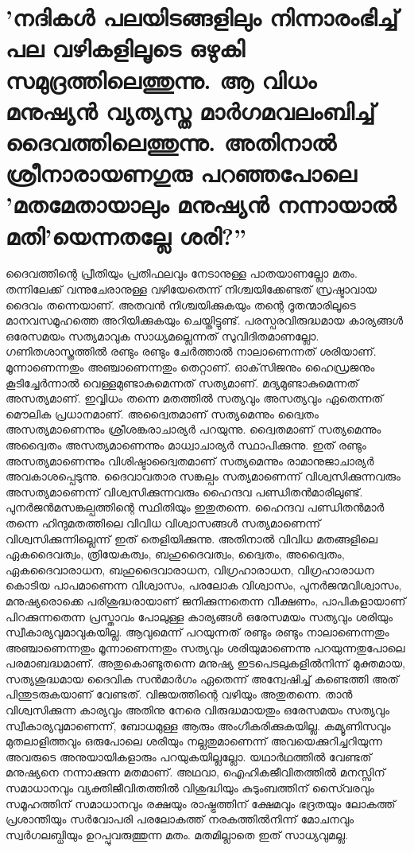  \section{'നദികള്‍ പലയിടങ്ങളിലും നിന്നാരംഭിച്ച് പല വഴികളിലൂടെ ഒഴുകി സമുദ്രത്തിലെത്തുന്നു. ആ വിധം മനുഷ്യന്‍ വ്യത്യസ്ത മാര്‍ഗമവലംബിച്ച് ദൈവത്തിലെത്തുന്നു. അതിനാല്‍ ശ്രീനാരായണഗുരു പറഞ്ഞപോലെ 'മതമേതായാലും മനുഷ്യന്‍ നന്നായാല്‍ മതി'യെന്നതല്ലേ ശരി?''}

ദൈവത്തിന്റെ പ്രീതിയും പ്രതിഫലവും നേടാനുള്ള പാതയാണല്ലോ മതം. തന്നിലേക്ക് വന്നുചേരാനുള്ള വഴിയേതെന്ന് നിശ്ചയിക്കേണ്ടത് സ്രഷ്ടാവായ ദൈവം തന്നെയാണ്. അതവന്‍ നിശ്ചയിക്കുകയും തന്റെ ദൂതന്മാരിലൂടെ മാനവസമൂഹത്തെ അറിയിക്കുകയും ചെയ്തിട്ടുണ്ട്.
പരസ്പരവിരുദ്ധമായ കാര്യങ്ങള്‍ ഒരേസമയം സത്യമാവുക സാധ്യമല്ലെന്നത് സുവിദിതമാണല്ലോ. ഗണിതശാസ്ത്രത്തില്‍ രണ്ടും രണ്ടും ചേര്‍ത്താല്‍ നാലാണെന്നത് ശരിയാണ്. മൂന്നാണെന്നതും അഞ്ചാണെന്നതും തെറ്റാണ്. ഓക്‌സിജനും ഹൈഡ്രജനും കൂടിച്ചേര്‍ന്നാല്‍ വെള്ളമുണ്ടാകുമെന്നത് സത്യമാണ്. മദ്യമുണ്ടാകുമെന്നത് അസത്യമാണ്. ഇവ്വിധം തന്നെ മതത്തില്‍ സത്യവും അസത്യവും ഏതെന്നത് മൌലിക പ്രധാനമാണ്. അദ്വൈതമാണ് സത്യമെന്നും ദ്വൈതം അസത്യമാണെന്നും ശ്രീശങ്കരാചാര്യര്‍ പറയുന്നു. ദ്വൈതമാണ് സത്യമെന്നും അദ്വൈതം അസത്യമാണെന്നും മാധ്വാചാര്യര്‍ സ്ഥാപിക്കുന്നു. ഇത് രണ്ടും അസത്യമാണെന്നും വിശിഷ്ടാദ്വൈതമാണ് സത്യമെന്നും രാമാനുജാചാര്യര്‍ അവകാശപ്പെടുന്നു. ദൈവാവതാര സങ്കല്പം സത്യമാണെന്ന് വിശ്വസിക്കുന്നവരും അസത്യമാണെന്ന് വിശ്വസിക്കുന്നവരും ഹൈന്ദവ പണ്ഡിതന്‍മാരിലുണ്ട്. പുനര്‍ജന്‍മസങ്കല്പത്തിന്റെ സ്ഥിതിയും ഇതുതന്നെ. ഹൈന്ദവ പണ്ഡിതന്‍മാര്‍ തന്നെ ഹിന്ദുമതത്തിലെ വിവിധ വിശ്വാസങ്ങള്‍ സത്യമാണെന്ന് വിശ്വസിക്കുന്നില്ലെന്ന് ഇത് തെളിയിക്കുന്നു. അതിനാല്‍ വിവിധ മതങ്ങളിലെ ഏകദൈവത്വം, ത്രിയേകത്വം, ബഹുദൈവത്വം, ദ്വൈതം, അദ്വൈതം, ഏകദൈവാരാധന, ബഹുദൈവാരാധന, വിഗ്രഹാരാധന, വിഗ്രഹാരാധന കൊടിയ പാപമാണെന്ന വിശ്വാസം, പരലോക വിശ്വാസം, പുനര്‍ജന്മവിശ്വാസം, മനുഷ്യരൊക്കെ പരിശുദ്ധരായാണ് ജനിക്കുന്നതെന്ന വീക്ഷണം, പാപികളായാണ് പിറക്കുന്നതെന്ന പ്രസ്താവം പോലുള്ള കാര്യങ്ങള്‍ ഒരേസമയം സത്യവും ശരിയും സ്വീകാര്യവുമാവുകയില്ല. ആവുമെന്ന് പറയുന്നത് രണ്ടും രണ്ടും നാലാണെന്നതും അഞ്ചാണെന്നതും മൂന്നാണെന്നതും സത്യവും ശരിയുമാണെന്നു പറയുന്നതുപോലെ പരമാബദ്ധമാണ്.
അതുകൊണ്ടുതന്നെ മനുഷ്യ ഇടപെടലുകളില്‍നിന്ന് മുക്തമായ, സത്യശുദ്ധമായ ദൈവിക സന്‍മാര്‍ഗം ഏതെന്ന് അന്വേഷിച്ച് കണ്ടെത്തി അത് പിന്തുടരുകയാണ് വേണ്ടത്. വിജയത്തിന്റെ വഴിയും അതുതന്നെ. താന്‍ വിശ്വസിക്കുന്ന കാര്യവും അതിനു നേരെ വിരുദ്ധമായതും ഒരേസമയം സത്യവും സ്വീകാര്യവുമാണെന്ന്, ബോധമുള്ള ആരും അംഗീകരിക്കുകയില്ല. കമ്യൂണിസവും മുതലാളിത്തവും ഒരുപോലെ ശരിയും നല്ലതുമാണെന്ന് അവയെക്കുറിച്ചറിയുന്ന അവരുടെ അനുയായികളാരും പറയുകയില്ലല്ലോ.
യഥാര്‍ഥത്തില്‍ വേണ്ടത് മനുഷ്യനെ നന്നാക്കുന്ന മതമാണ്. അഥവാ, ഐഹികജീവിതത്തില്‍ മനസ്സിന് സമാധാനവും വ്യക്തിജീവിതത്തില്‍ വിശുദ്ധിയും കുടുംബത്തിന് സൈ്വരവും സമൂഹത്തിന് സമാധാനവും രക്ഷയും രാഷ്ട്രത്തിന് ക്ഷേമവും ഭദ്രതയും ലോകത്ത് പ്രശാന്തിയും സര്‍വോപരി പരലോകത്ത് നരകത്തില്‍നിന്ന് മോചനവും സ്വര്‍ഗലബ്ധിയും ഉറപ്പുവരുത്തുന്ന മതം. മതമില്ലാതെ ഇത് സാധ്യവുമല്ല.


